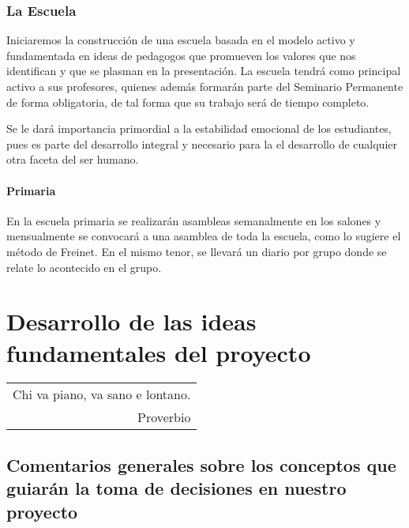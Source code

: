 \documentclass[10pt,letterpaper]{report}
\makeatletter
\newenvironment{myepigraph}
  {\par\hfill\itshape
   \begin{tabular}{@{}r@{\hspace{2em}}}} %
  {\end{tabular}\par\medskip}
\makeatother
\begin{document}
\subsection{La Escuela}
Iniciaremos la construcción de una escuela basada en el modelo activo y fundamentada en ideas de pedagogos que promueven los valores que nos identifican y que se plasman en la presentación. La escuela tendrá como principal activo  a sus profesores, quienes además formarán parte del Seminario Permanente de forma obligatoria, de tal forma que su trabajo será de tiempo completo.

Se le dará importancia primordial a la estabilidad emocional de los estudiantes, pues es parte del desarrollo integral y necesario para la el desarrollo de cualquier otra faceta del ser humano.

\subsubsection{Primaria}
En la escuela primaria se realizarán asambleas semanalmente en los salones y mensualmente se convocará a una asamblea de toda la escuela, como lo sugiere el método de Freinet. En el mismo tenor, se llevará un diario por grupo donde se relate lo acontecido en el grupo.

\chapter{Desarrollo de las ideas fundamentales del proyecto}

\begin{myepigraph}
Chi va piano, va sano e lontano.\\
Proverbio
\end{myepigraph}

\section{Comentarios generales sobre los conceptos que guiarán la toma de decisiones en nuestro proyecto}
\end{document}
